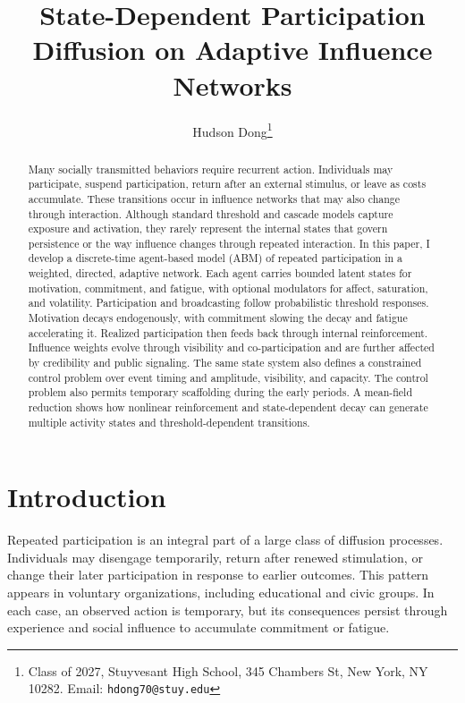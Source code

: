 \documentclass[11pt]{article}
\title{\textbf{State-Dependent Participation Diffusion on Adaptive Influence Networks}}
\author{Hudson Dong\thanks{Class of 2027, Stuyvesant High School, 345 Chambers St, New York, NY 10282. Email: \texttt{hdong70@stuy.edu}}}
\date{}
\begin{document}
\maketitle
\begin{abstract}
Many socially transmitted behaviors require recurrent action. Individuals may participate, suspend participation, return after an external stimulus, or leave as costs accumulate. These transitions occur in influence networks that may also change through interaction. Although standard threshold and cascade models capture exposure and activation, they rarely represent the internal states that govern persistence or the way influence changes through repeated interaction. In this paper, I develop a discrete-time agent-based model (ABM) of repeated participation in a weighted, directed, adaptive network. Each agent carries bounded latent states for motivation, commitment, and fatigue, with optional modulators for affect, saturation, and volatility. Participation and broadcasting follow probabilistic threshold responses. Motivation decays endogenously, with commitment slowing the decay and fatigue accelerating it. Realized participation then feeds back through internal reinforcement. Influence weights evolve through visibility and co-participation and are further affected by credibility and public signaling. The same state system also defines a constrained control problem over event timing and amplitude, visibility, and capacity. The control problem also permits temporary scaffolding during the early periods. A mean-field reduction shows how nonlinear reinforcement and state-dependent decay can generate multiple activity states and threshold-dependent transitions.

 \end{abstract}

\section{Introduction}
Repeated participation is an integral part of a large class of diffusion processes. Individuals may disengage temporarily, return after renewed stimulation, or change their later participation in response to earlier outcomes. This pattern appears in voluntary organizations, including educational and civic groups. In each case, an observed action is temporary, but its consequences persist through experience and social influence to accumulate commitment or fatigue.
\end{document}
